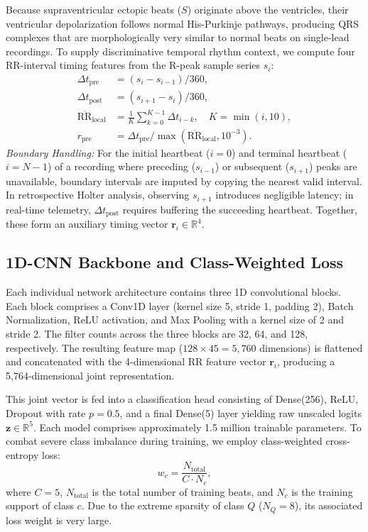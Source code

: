 \documentclass[conference]{IEEEtran}
\begin{document}
Because supraventricular ectopic beats ($S$) originate above the ventricles, their ventricular depolarization follows normal His-Purkinje pathways, producing QRS complexes that are morphologically very similar to normal beats on single-lead recordings. To supply discriminative temporal rhythm context, we compute four RR-interval timing features from the R-peak sample series $s_i$:
\begin{align}
\Delta t_{\text{pre}} &= (s_i - s_{i-1}) / 360, \\
\Delta t_{\text{post}} &= (s_{i+1} - s_i) / 360, \\
\overline{\text{RR}}_{\text{local}} &= \frac{1}{K}\sum_{k=0}^{K-1} \Delta t_{i-k}, \quad K = \min(i, 10), \\
r_{\text{pre}} &= \Delta t_{\text{pre}} / \max(\overline{\text{RR}}_{\text{local}}, 10^{-3}).
\end{align}
\textit{Boundary Handling:} For the initial heartbeat ($i=0$) and terminal heartbeat ($i=N-1$) of a recording where preceding ($s_{i-1}$) or subsequent ($s_{i+1}$) peaks are unavailable, boundary intervals are imputed by copying the nearest valid interval. In retrospective Holter analysis, observing $s_{i+1}$ introduces negligible latency; in real-time telemetry, $\Delta t_{\text{post}}$ requires buffering the succeeding heartbeat. Together, these form an auxiliary timing vector $\mathbf{r}_i \in \mathbb{R}^4$.

\subsection{1D-CNN Backbone and Class-Weighted Loss}
Each individual network architecture contains three 1D convolutional blocks. Each block comprises a Conv1D layer (kernel size 5, stride 1, padding 2), Batch Normalization, ReLU activation, and Max Pooling with a kernel size of 2 and stride 2. The filter counts across the three blocks are 32, 64, and 128, respectively. The resulting feature map ($128 \times 45 = 5{,}760$ dimensions) is flattened and concatenated with the 4-dimensional RR feature vector $\mathbf{r}_i$, producing a 5,764-dimensional joint representation.

This joint vector is fed into a classification head consisting of Dense(256), ReLU, Dropout with rate $p=0.5$, and a final Dense(5) layer yielding raw unscaled logits $\mathbf{z} \in \mathbb{R}^5$. Each model comprises approximately 1.5 million trainable parameters. To combat severe class imbalance during training, we employ class-weighted cross-entropy loss:
\begin{equation}
w_c = \frac{N_{\text{total}}}{C \cdot N_c},
\end{equation}
where $C=5$, $N_{\text{total}}$ is the total number of training beats, and $N_c$ is the training support of class $c$. Due to the extreme sparsity of class $Q$ ($N_Q=8$), its associated loss weight is very large.
\end{document}
